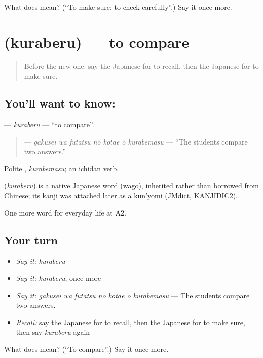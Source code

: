 \begin{tcolorbox}[breakable,colback=teal!4,colframe=teal!35!black,title={Before you move on}]
What does  mean? (\textquotedblleft{}To make sure; to check carefully\textquotedblright{}.) Say it once more.
\end{tcolorbox}
\section[\texorpdfstring{\ja{くらべる} (kuraberu)}{くらべる (kuraberu)}]{ (kuraberu) — to compare}

\label{lesson:JA-C227-kuraberu}



\begin{quote}
Before the new one: say the Japanese for to recall, then the Japanese for to make sure.
\end{quote}

\subsection*{You'll want to know: }
\textbf{} — \emph{kuraberu} — \textquotedblleft{}to compare\textquotedblright{}.

\begin{quote}
\textbf{   } — \emph{gakusei wa futatsu no kotae o kurabemasu} — \textquotedblleft{}The students compare two answers.\textquotedblright{}
\end{quote}

Polite \textbf{}, \emph{kurabemasu}; an ichidan verb.

\begin{cousinweb}
\textbf{} (\emph{kuraberu}) is a native Japanese word (wago), inherited rather than borrowed from Chinese; its kanji was attached later as a kun'yomi (JMdict, KANJIDIC2).
\end{cousinweb}

\begin{grammarlens}[title={What you've built}]
One more word for everyday life at A2.
\end{grammarlens}

\subsection*{Your turn}
\begin{itemize}
\raggedright
  \item \emph{Say it:} \emph{kuraberu}
  \item \emph{Say it:} \emph{kuraberu}, once more
  \item \emph{Say it:} \emph{gakusei wa futatsu no kotae o kurabemasu} — The students compare two answers.
  \item \emph{Recall:} say the Japanese for to recall, then the Japanese for to make sure, then say \emph{kuraberu} again
\end{itemize}

\begin{tcolorbox}[breakable,colback=teal!4,colframe=teal!35!black,title={Before you move on}]
What does  mean? (\textquotedblleft{}To compare\textquotedblright{}.) Say it once more.
\end{tcolorbox}
